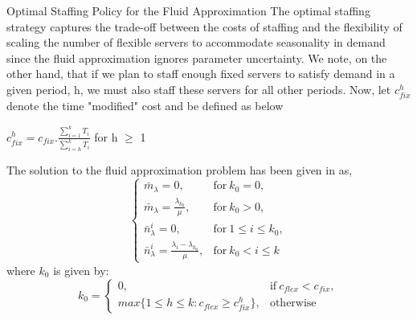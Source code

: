 \documentclass[8pt]{beamer}
\begin{document}
\begin{frame}{Optimal Staffing Policy for the Fluid Approximation}
The optimal staffing strategy captures the trade-off between the costs of staffing and the flexibility of scaling the number of flexible servers to accommodate seasonality in demand since the fluid approximation ignores parameter uncertainty. We note, on the other hand, that if we plan to staff enough fixed servers to satisfy demand in a given period, h, we must also staff these servers for all other periods. Now, let $c_{fix}^h$ denote the time "modified" cost and be defined as below \\
\begin{center}
$c_{fix}^h = c_{fix}.\frac{\sum_{i=1}^k T_i}{\sum_{i=h}^k T_i}$ for h $\geq$ 1 \\    
\end{center}
\begin{lemma}
The solution to the fluid approximation problem has been given in \cite{dong} as, 
$$
\begin{cases}
      \bar{m}_{\lambda} = 0, & \text{for}\ k_0=0, \\
      \bar{m}_{\lambda} = \frac{\lambda_{k_0}}{\mu}, & \text{for}\ k_0>0, \\
      \bar{n}_{\lambda}^i = 0, & \text{for}\ 1 \leq i \leq k_0, \\
      \bar{n}_{\lambda}^i = \frac{\lambda_i - \lambda_{k_0}}{\mu}, & \text{for}\ k_0 < i \leq k 
    \end{cases}
$$
where $k_0$ is given by:
$$
k_0 = 
\begin{cases}
      0, & \text{if}\ c_{flex} < c_{fix}, \\
      max\{1 \leq h \leq k: c_{flex} \geq c_{fix}^h\}, & \text{otherwise}
    \end{cases}
$$

\end{lemma}
\end{frame}
\end{document}
